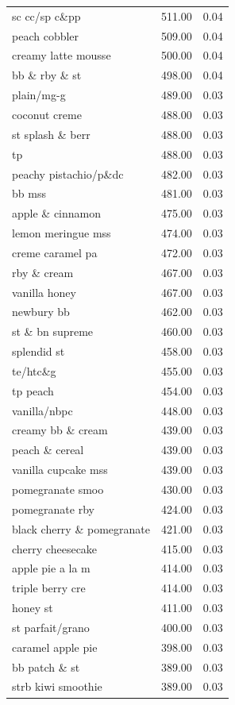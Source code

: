\begin{table}
\begin{tabular}{lrr}
sc cc/sp c\&pp & 511.00 & 0.04 \\
peach cobbler & 509.00 & 0.04 \\
creamy latte mousse & 500.00 & 0.04 \\
bb \& rby \& st & 498.00 & 0.04 \\
plain/mg-g & 489.00 & 0.03 \\
coconut creme & 488.00 & 0.03 \\
st splash \& berr & 488.00 & 0.03 \\
tp & 488.00 & 0.03 \\
peachy pistachio/p\&dc & 482.00 & 0.03 \\
bb mss & 481.00 & 0.03 \\
apple \& cinnamon & 475.00 & 0.03 \\
lemon meringue mss & 474.00 & 0.03 \\
creme caramel pa & 472.00 & 0.03 \\
rby \& cream & 467.00 & 0.03 \\
vanilla honey & 467.00 & 0.03 \\
newbury bb & 462.00 & 0.03 \\
st \& bn supreme & 460.00 & 0.03 \\
splendid st & 458.00 & 0.03 \\
te/htc\&g & 455.00 & 0.03 \\
tp peach & 454.00 & 0.03 \\
vanilla/nbpc & 448.00 & 0.03 \\
creamy bb \& cream & 439.00 & 0.03 \\
peach \& cereal & 439.00 & 0.03 \\
vanilla cupcake mss & 439.00 & 0.03 \\
pomegranate smoo & 430.00 & 0.03 \\
pomegranate rby & 424.00 & 0.03 \\
black cherry \& pomegranate & 421.00 & 0.03 \\
cherry cheesecake & 415.00 & 0.03 \\
apple pie a la m & 414.00 & 0.03 \\
triple berry cre & 414.00 & 0.03 \\
honey st & 411.00 & 0.03 \\
st parfait/grano & 400.00 & 0.03 \\
caramel apple pie & 398.00 & 0.03 \\
bb patch \& st & 389.00 & 0.03 \\
strb kiwi smoothie & 389.00 & 0.03 \\

\end{tabular}
\end{table}
